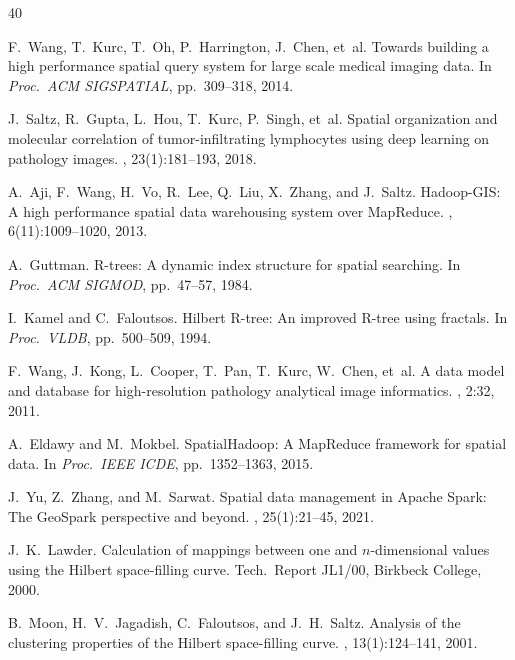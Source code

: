 \documentclass[sigconf]{acmart}
\begin{document}

\begin{thebibliography}{40}

F.~Wang, T.~Kurc, T.~Oh, P.~Harrington, J.~Chen, et~al.
\newblock Towards building a high performance spatial query system for large scale medical imaging data.
\newblock In {\em Proc.\ ACM SIGSPATIAL}, pp.~309--318, 2014.

J.~Saltz, R.~Gupta, L.~Hou, T.~Kurc, P.~Singh, et~al.
\newblock Spatial organization and molecular correlation of tumor-infiltrating lymphocytes using deep learning on pathology images.
, 23(1):181--193, 2018.

A.~Aji, F.~Wang, H.~Vo, R.~Lee, Q.~Liu, X.~Zhang, and J.~Saltz.
\newblock Hadoop-GIS: A high performance spatial data warehousing system over MapReduce.
, 6(11):1009--1020, 2013.

A.~Guttman.
\newblock R-trees: A dynamic index structure for spatial searching.
\newblock In {\em Proc.\ ACM SIGMOD}, pp.~47--57, 1984.

I.~Kamel and C.~Faloutsos.
\newblock Hilbert R-tree: An improved R-tree using fractals.
\newblock In {\em Proc.\ VLDB}, pp.~500--509, 1994.

F.~Wang, J.~Kong, L.~Cooper, T.~Pan, T.~Kurc, W.~Chen, et~al.
\newblock A data model and database for high-resolution pathology analytical image informatics.
, 2:32, 2011.

A.~Eldawy and M.~Mokbel.
\newblock SpatialHadoop: A MapReduce framework for spatial data.
\newblock In {\em Proc.\ IEEE ICDE}, pp.~1352--1363, 2015.

J.~Yu, Z.~Zhang, and M.~Sarwat.
\newblock Spatial data management in Apache Spark: The GeoSpark perspective and beyond.
, 25(1):21--45, 2021.

J.~K.~Lawder.
\newblock Calculation of mappings between one and $n$-dimensional values using the Hilbert space-filling curve.
\newblock Tech.\ Report JL1/00, Birkbeck College, 2000.

B.~Moon, H.~V.~Jagadish, C.~Faloutsos, and J.~H.~Saltz.
\newblock Analysis of the clustering properties of the Hilbert space-filling curve.
, 13(1):124--141, 2001.


\end{thebibliography}
\end{document}
